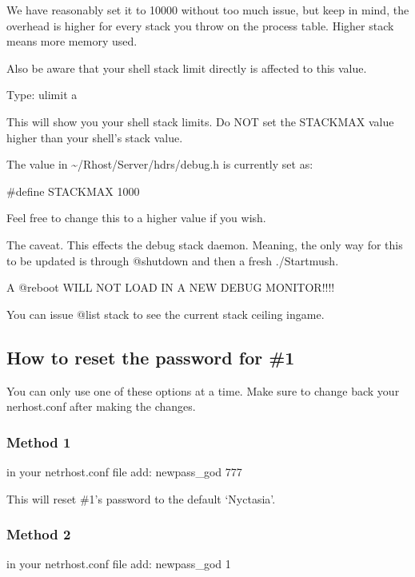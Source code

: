 \documentclass[letterpaper,10pt,english]{sphinxmanual}
\begin{document}
\sphinxAtStartPar
We have reasonably set it to 10000 without too much issue, but keep
in mind, the overhead is higher for every stack you throw on the
process table.  Higher stack means more memory used.

\sphinxAtStartPar
Also be aware that your shell stack limit directly is affected
to this value.

\sphinxAtStartPar
Type: ulimit \sphinxhyphen{}a

\sphinxAtStartPar
This will show you your shell stack limits.  Do NOT set the
STACKMAX value higher than your shell’s stack value.

\sphinxAtStartPar
The value in \textasciitilde{}/Rhost/Server/hdrs/debug.h is currently set as:

\sphinxAtStartPar
\#define STACKMAX 1000

\sphinxAtStartPar
Feel free to change this to a higher value if you wish.

\sphinxAtStartPar
The caveat.  This effects the debug stack daemon.  Meaning,
the only way for this to be updated is through @shutdown and
then a fresh ./Startmush.

\sphinxAtStartPar
A @reboot WILL NOT LOAD IN A NEW DEBUG MONITOR!!!!

\sphinxAtStartPar
You can issue @list stack to see the current stack ceiling ingame.


\subsection{How to reset the password for \#1}
\label{\detokenize{troubleshooting:how-to-reset-the-password-for-1}}
\sphinxAtStartPar
You can only use one of these options at a time. Make sure to change back your nerhost.conf after making the changes.


\subsubsection{Method 1}
\label{\detokenize{troubleshooting:method-1}}
\sphinxAtStartPar
in your netrhost.conf file add:
newpass\_god 777

\sphinxAtStartPar
This will reset \#1’s password to the default ‘Nyctasia’.


\subsubsection{Method 2}
\label{\detokenize{troubleshooting:method-2}}
\sphinxAtStartPar
in your netrhost.conf file add:
newpass\_god 1
\end{document}

